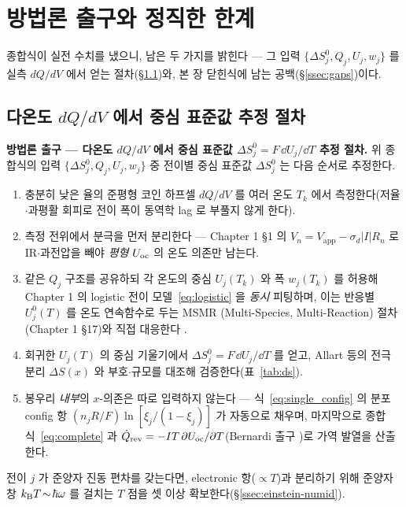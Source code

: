 \section{방법론 출구와 정직한 한계}\label{sec:method}

종합식이 실전 수치를 냈으니, 남은 두 가지를 밝힌다 --- 그 입력 $\{\Delta S^0_j,Q_j,U_j,w_j\}$ 를 실측
$dQ/dV$ 에서 얻는 절차(\S\ref{ssec:procedure})와, 본 장 닫힌식에 남는 공백(\S\ref{ssec:gaps})이다.

\subsection{다온도 $dQ/dV$ 에서 중심 표준값 추정 절차}\label{ssec:procedure}
\begin{procedurebox}
\textbf{방법론 출구 --- 다온도 $dQ/dV$ 에서 중심 표준값 $\Delta S^0_j=F\,\dd U_j/\dd T$ 추정 절차.} 위 종합식의
입력 $\{\Delta S^0_j,Q_j,U_j,w_j\}$ 중 전이별 중심 표준값 $\Delta S^0_j$ 는 다음 순서로 추정한다.
\begin{enumerate}[leftmargin=1.8em,itemsep=2pt,topsep=2pt]
\item 충분히 낮은 율의 준평형 코인 하프셀 $dQ/dV$ 를 여러 온도 $T_k$ 에서 측정한다(저율$\cdot$과평활 회피로
전이 폭이 동역학 lag 로 부풀지 않게 한다).
\item 측정 전위에서 분극을 먼저 분리한다 --- Chapter 1 §1 의 $V_n=V_\mathrm{app}-\sigma_d|I|R_n$ 로
IR$\cdot$과전압을 빼야 \emph{평형} $U_{\mathrm{oc}}$ 의 온도 의존만 남는다.
\item 같은 $Q_j$ 구조를 공유하되 각 온도의 중심 $U_j(T_k)$ 와 폭 $w_j(T_k)$ 를 허용해 Chapter 1 의 logistic
전이 모델~\eqref{eq:logistic} 을 \emph{동시} 피팅하며, 이는 반응별 $U_j^0(T)$ 를 온도 연속함수로 두는 MSMR
(Multi-Species, Multi-Reaction) 절차(Chapter 1 §17)와 직접 대응한다 \cite{msmr_partI,msmr_partII}.
\item 회귀한 $U_j(T)$ 의 중심 기울기에서 $\Delta S^0_j=F\,\dd U_j/\dd T$ 를 얻고, Allart 등의 전극 분리
$\Delta S(x)$ \cite{allart2018} 와 부호$\cdot$규모를 대조해 검증한다(표~\ref{tab:ds}).
\item 봉우리 \emph{내부}의 $x$-의존은 따로 입력하지 않는다 --- 식~\eqref{eq:single_config} 의 분포 config 항
$(n_jR/F)\ln[\xi_j/(1-\xi_j)]$ 가 자동으로 채우며, 마지막으로 종합식~\eqref{eq:complete} 과
$\dot Q_{\mathrm{rev}}=-IT\,\partial U_{\mathrm{oc}}/\partial T$(Bernardi 출구 \cite{bernardi1985})로 가역 발열을 산출한다.
\end{enumerate}
전이 $j$ 가 준양자 진동 편차를 갖는다면, electronic 항($\propto T$)과 분리하기 위해 준양자 창 $k_{\mathrm B}
T\!\sim\!\hbar\omega$ 를 걸치는 $T$ 점을 셋 이상 확보한다(\S\ref{ssec:einstein-numid}).
\end{procedurebox}

